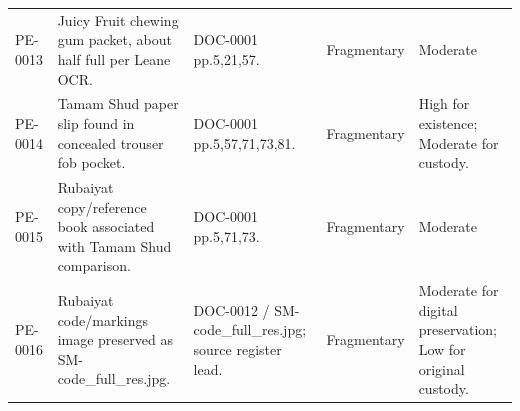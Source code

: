 \begin{longtable}{p{}p{}p{}p{}p{}}
PE-0013 & Juicy Fruit chewing gum packet, about half full per Leane OCR. & DOC-0001 pp.5,21,57. & Fragmentary & Moderate \\
PE-0014 & Tamam Shud paper slip found in concealed trouser fob pocket. & DOC-0001 pp.5,57,71,73,81. & Fragmentary & High for existence; Moderate for custody. \\
PE-0015 & Rubaiyat copy/reference book associated with Tamam Shud comparison. & DOC-0001 pp.5,71,73. & Fragmentary & Moderate \\
PE-0016 & Rubaiyat code/markings image preserved as SM-code\_full\_res.jpg. & DOC-0012 / SM-code\_full\_res.jpg; source register lead. & Fragmentary & Moderate for digital preservation; Low for original custody. \\
\bottomrule
\end{longtable}

